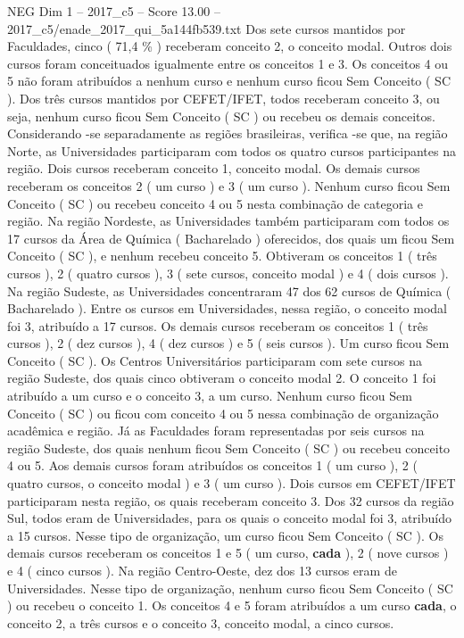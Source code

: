 \begin{textsample}{NEG Dim 1 – 2017\_c5 – Score 13.00 – 2017\_c5/enade\_2017\_qui\_5a144fb539.txt}
Dos sete cursos mantidos por Faculdades, cinco ( 71,4 \% ) receberam conceito 2, o conceito modal.
Outros dois cursos foram conceituados igualmente entre os conceitos 1 e 3.
Os conceitos 4 ou 5 não foram atribuídos a nenhum curso e nenhum curso ficou Sem Conceito ( SC ).
Dos três cursos mantidos por CEFET/IFET, todos receberam conceito 3, ou seja, nenhum curso ficou Sem Conceito ( SC ) ou recebeu os demais conceitos.
Considerando -se separadamente as regiões brasileiras, verifica -se que, na região Norte, as Universidades participaram com todos os quatro cursos participantes na região.
Dois cursos receberam conceito 1, conceito modal.
Os demais cursos receberam os conceitos 2 ( um curso ) e 3 ( um curso ).
Nenhum curso ficou Sem Conceito ( SC ) ou recebeu conceito 4 ou 5 nesta combinação de categoria e região.
Na região Nordeste, as Universidades também participaram com todos os 17 cursos da Área de Química ( Bacharelado ) oferecidos, dos quais um ficou Sem Conceito ( SC ), e nenhum recebeu conceito 5.
Obtiveram os conceitos 1 ( três cursos ), 2 ( quatro cursos ), 3 ( sete cursos, conceito modal ) e 4 ( dois cursos ).
Na região Sudeste, as Universidades concentraram 47 dos 62 cursos de Química ( Bacharelado ).
Entre os cursos em Universidades, nessa região, o conceito modal foi 3, atribuído a 17 cursos.
Os demais cursos receberam os conceitos 1 ( três cursos ), 2 ( dez cursos ), 4 ( dez cursos ) e 5 ( seis cursos ).
Um curso ficou Sem Conceito ( SC ).
Os Centros Universitários participaram com sete cursos na região Sudeste, dos quais cinco obtiveram o conceito modal 2.
O conceito 1 foi atribuído a um curso e o conceito 3, a um curso.
Nenhum curso ficou Sem Conceito ( SC ) ou ficou com conceito 4 ou 5 nessa combinação de organização acadêmica e região.
Já as Faculdades foram representadas por seis cursos na região Sudeste, dos quais nenhum ficou Sem Conceito ( SC ) ou recebeu conceito 4 ou 5.
Aos demais cursos foram atribuídos os conceitos 1 ( um curso ), 2 ( quatro cursos, o conceito modal ) e 3 ( um curso ).
Dois cursos em CEFET/IFET participaram nesta região, os quais receberam conceito 3.
Dos 32 cursos da região Sul, todos eram de Universidades, para os quais o conceito modal foi 3, atribuído a 15 cursos.
Nesse tipo de organização, um curso ficou Sem Conceito ( SC ).
Os demais cursos receberam os conceitos 1 e 5 ( um curso, \textbf{cada} ), 2 ( nove cursos ) e 4 ( cinco cursos ).
Na região Centro-Oeste, dez dos 13 cursos eram de Universidades.
Nesse tipo de organização, nenhum curso ficou Sem Conceito ( SC ) ou recebeu o conceito 1.
Os conceitos 4 e 5 foram atribuídos a um curso \textbf{cada}, o conceito 2, a três cursos e o conceito 3, conceito modal, a cinco cursos.

\end{textsample}
